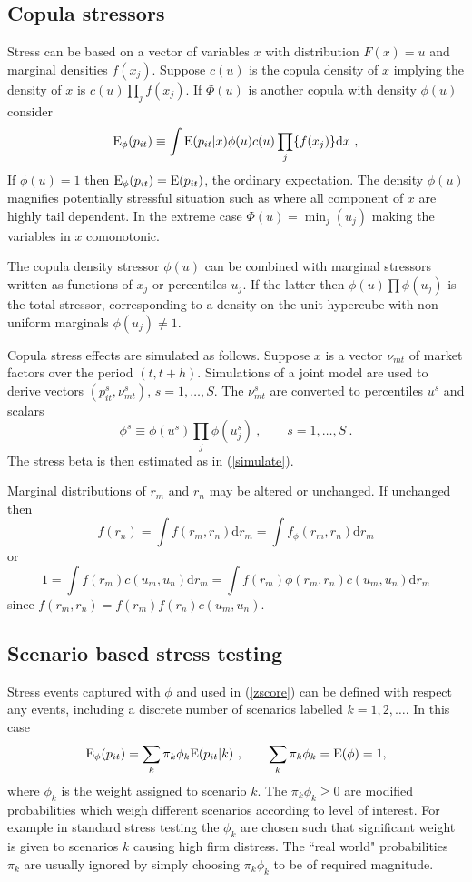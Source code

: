 \documentclass[authoryear]{elsarticle}
\newcommand{\E}{\mathrm{E}}
\newcommand{\de}{\mathrm{d}}
\newcommand{\eref}[1]{(\ref{#1})}
\newcommand{\cq}{\ , \qquad}
\newcommand{\be}[1]{\begin{equation}\label{#1}}
\newcommand{\ee}{\end{equation}}
\begin{document}
\subsection{Copula stressors}


Stress can be based on a vector of variables $x$ with distribution $F(x)=u$ and marginal densities $f(x_j)$.    Suppose $c(u)$ is the copula density of $x$ implying the density of $x$ is $c(u)\prod_jf(x_j)$.    If  $\Phi(u)$ is another copula with density $\phi(u)$ 
consider
\be{copula}
\Es(p_{it}) \equiv \int \E(p_{it}|x)\phi(u)c(u)\prod_j\{f(x_j)\}  \de x   \ ,
\ee
If $\phi(u)=1$  then $\Es(p_{it})=\E(p_{it})$, the ordinary expectation.   The density $\phi(u)$ magnifies potentially stressful situation such as where all component of $x$ are highly  tail dependent.     In the extreme case  $\Phi(u)=\min_j(u_j)$ making the  variables in $x$  comonotonic. 

The copula density stressor $\phi(u)$  can be combined with marginal stressors written as functions of $x_j$ or  percentiles $u_j$.  If the latter then $\phi(u)\prod\phi(u_j)$ is the total stressor, corresponding to a density on the unit hypercube with non--uniform marginals  $\phi(u_j)\ne 1$. 
  
Copula stress effects are simulated as follows.   Suppose $x$ is a vector $\nu_{mt}$ of  market factors  over the period $(t,t+h)$.   Simulations of a joint model are  used to  derive  vectors $(p_{it}^s,\nu_{mt}^s)$, $ s=1,\ldots, S$.  The $\nu_{mt}^s$ are  converted to percentiles $u^s$ and scalars 
$$
\phi^s\equiv\phi(u^s)\prod_j\phi(u_j^s)\cq s=1,\ldots, S\ .
$$
The stress beta is then estimated as in \eref{simulate}.



   
Marginal distributions of $r_m$ and $r_n$ may be altered or unchanged. If unchanged then
$$
f(r_n) = \int f(r_m,r_n) \de r_m = \int f_\phi(r_m,r_n) \de r_m
$$
or 
$$
1 = \int f(r_m)c(u_m,u_n) \de r_m = \int f(r_m)\phi(r_m,r_n) c(u_m,u_n) \de r_m
$$
since $f(r_m,r_n)=f(r_m)f(r_n)c(u_m,u_n)$.   


 
 \subsection{Scenario based stress testing}
 Stress events captured with $\phi$ and used  in \eref{zscore}  can be defined with respect any events, including a discrete number of scenarios labelled $k=1,2, \ldots$.   In this case 
$$
\Es(p_{it})= \sum_k \pi_k\phi_k\E(p_{it}|k)\cq \sum_k\pi_k\phi_k = \E(\phi) = 1 ,
$$
where $\phi_k$ is the weight assigned to scenario $k$.   The $\pi_k\phi_k\ge 0$ are  modified  probabilities which weigh different scenarios according to level of interest.   For example in standard stress testing the $\phi_k$ are chosen such that significant weight is given to scenarios $k$ causing high  firm distress.   The ``real world" probabilities $\pi_k$ are  usually ignored by  simply choosing  $\pi_k\phi_k$ to be of  required magnitude. 
\end{document}
